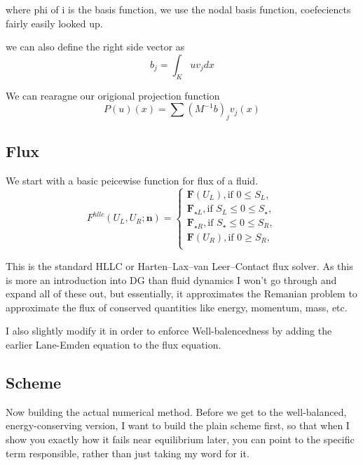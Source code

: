 where phi of i is the basis function, we use the nodal basis function, coefeciencts fairly easily looked up.

we can also define the right side vector as
\[
	b_j = \int_K u v_j dx
\]

We can rearagne our origional projection function
\[
	P(u)(x) = \sum (M^{-1}b)_j v_j(x)
\]

\subsection{Flux}

We start with a basic peicewise function for flux of a fluid.
\[
	F^{hllc}(U_L, U_R; \mathbf{n}) =
	\begin{cases}
		\mathbf{F}(U_L), \text{if } 0 \leq S_L,                   \\
		\mathbf{F}_{\star L}, \text{if } S_L \leq 0 \leq S_\star, \\
		\mathbf{F}_{\star R}, \text{if } S_\star \leq 0 \leq S_R, \\
		\mathbf{F}(U_R), \text{if } 0 \geq S_R,                   \\
	\end{cases}
\]

This is the standard HLLC or Harten–Lax–van Leer–Contact flux solver. As this is more an introduction into DG than fluid dynamics I won't go through and expand all of these out, but essentially, it approximates the Remanian problem to approximate the flux of conserved quantities like energy, momentum, mass, etc.

I also slightly modify it in order to enforce Well-balencedness by adding the earlier Lane-Emden equation to the flux equation.

\subsection{Scheme}
Now building the actual numerical method. Before we get to the well-balanced, energy-conserving version, I want to build the plain scheme first, so that when I show you exactly how it fails near equilibrium later, you can point to the specific term responsible, rather than just taking my word for it.

